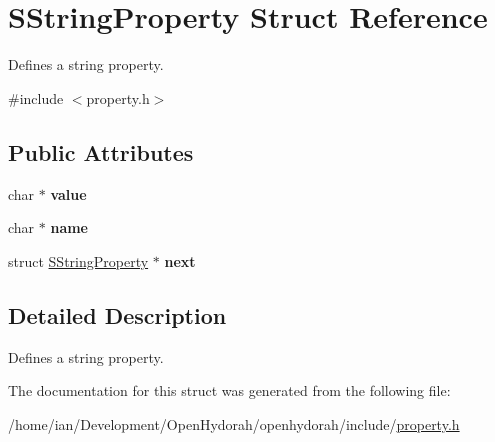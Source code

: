 \hypertarget{structSStringProperty}{\section{S\-String\-Property Struct Reference}
\label{structSStringProperty}
}


Defines a string property.  




{\ttfamily \#include $<$property.\-h$>$}

\subsection*{Public Attributes}
\begin{DoxyCompactItemize}
\item 
\hypertarget{structSStringProperty_a6a388eca3cd06ce9b25384b83ab9774b}{char $\ast$ {\bfseries value}}\label{structSStringProperty_a6a388eca3cd06ce9b25384b83ab9774b}

\item 
\hypertarget{structSStringProperty_a94614b68bd02a24af31556805d2ef824}{char $\ast$ {\bfseries name}}\label{structSStringProperty_a94614b68bd02a24af31556805d2ef824}

\item 
\hypertarget{structSStringProperty_a4ec1817100d89c91965565b774b706c0}{struct \hyperlink{structSStringProperty}{S\-String\-Property} $\ast$ {\bfseries next}}\label{structSStringProperty_a4ec1817100d89c91965565b774b706c0}

\end{DoxyCompactItemize}


\subsection{Detailed Description}
Defines a string property. 

The documentation for this struct was generated from the following file\-:\begin{DoxyCompactItemize}
\item 
/home/ian/\-Development/\-Open\-Hydorah/openhydorah/include/\hyperlink{property_8h}{property.\-h}\end{DoxyCompactItemize}
